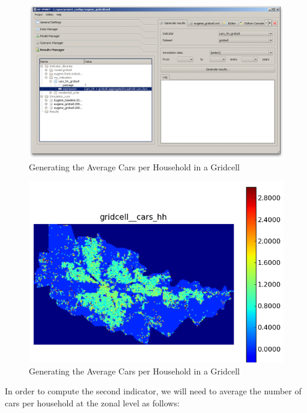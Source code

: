 \begin{figure}[htp]
\begin{center}
\includegraphics[scale=0.4]{graphics/indicator-cars-gridcell-1.png}
\end{center}
\caption{Generating the Average Cars per Household in a Gridcell}
\label{fig:indicator-cars-gridcell-1}
\end{figure}

\begin{figure}[htp]
\begin{center}
\includegraphics[scale=0.4]{graphics/indicator-cars-gridcell-2.png}
\end{center}
\caption{Generating the Average Cars per Household in a Gridcell}
\label{fig:indicator-cars-gridcell-2}
\end{figure}

In order to compute the second indicator, we will need to average the number of cars per household at the zonal level as follows:

